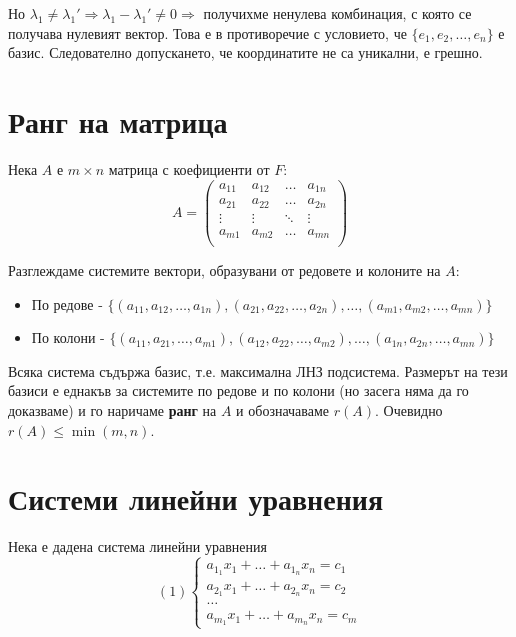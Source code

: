 \documentclass[fleqn,12pt]{article}
\begin{document}
\begin{flushleft}
Но $\lambda_1 \neq \lambda_1' \Rightarrow \lambda_1 - \lambda_1' \neq 0 \Rightarrow$ получихме ненулева комбинация, с която се получава 
нулевият вектор. Това е в противоречие с условието, че $\{e_1, e_2, \dots, e_n\}$ е базис. Следователно допускането, че координатите не са уникални, е грешно.

\section{Ранг на матрица}
Нека $A$ е $m \times n$ матрица с коефициенти от $F$:
\[ A = \begin{pmatrix}
    a_{11} & a_{12} & \dots & a_{1n} \\
    a_{21} & a_{22} & \dots & a_{2n} \\
    \vdots & \vdots & \ddots & \vdots \\
    a_{m1} & a_{m2} & \dots & a_{mn} \\
\end{pmatrix}\]

Разглеждаме системите вектори, образувани от редовете и колоните на $A$:
\begin{itemize}
    \item По редове - $\{ (a_{11}, a_{12}, \dots, a_{1n}), (a_{21}, a_{22}, \dots, a_{2n}), \dots, (a_{m1}, a_{m2}, \dots, a_{mn}) \}$
    \item По колони - $\{ (a_{11}, a_{21}, \dots, a_{m1}), (a_{12}, a_{22}, \dots, a_{m2}), \dots, (a_{1n}, a_{2n}, \dots, a_{mn}) \}$
\end{itemize}

Всяка система съдържа базис, т.е. максимална ЛНЗ подсистема. Размерът на тези базиси е еднакъв за системите по редове и по колони (но засега няма да го доказваме)
и го наричаме \textbf{ранг} на $A$ и обозначаваме $r(A)$. Очевидно $r(A) \leq \min(m,n)$.
    
\section{Системи линейни уравнения}
Нека е дадена система линейни уравнения
\begin{equation*}
    (1)\begin{cases}
        a_{1_1}x_1+\dots+a_{1_n}x_n = c_1\\
        a_{2_1}x_1+\dots+a_{2_n}x_n = c_2\\
        \dots\\
        a_{m_1}x_1+\dots+a_{m_n}x_n = c_m
    \end{cases}
\end{equation*}


\end{flushleft}
\end{document}
